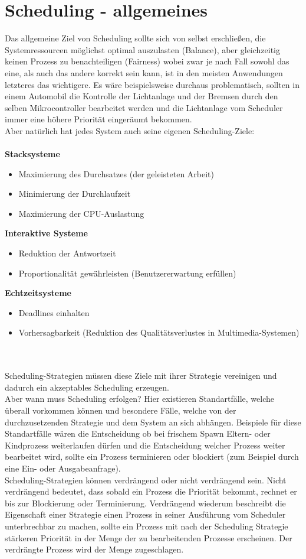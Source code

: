 \section{Scheduling - allgemeines}
Das allgemeine Ziel von Scheduling sollte sich von selbst erschließen, die Systemressourcen möglichst 
optimal auszulasten (Balance), aber gleichzeitig keinen Prozess zu benachteiligen (Fairness) wobei zwar je 
nach Fall sowohl das eine, als auch das andere korrekt sein kann, ist in den meisten Anwendungen letzteres 
das wichtigere. Es wäre beispielsweise durchaus problematisch, sollten in einem Automobil die Kontrolle der 
Lichtanlage und der Bremsen durch den selben Mikrocontroller bearbeitet werden und die Lichtanlage vom 
Scheduler immer eine höhere Priorität eingeräumt bekommen. \\
Aber natürlich hat jedes System auch seine eigenen Scheduling-Ziele: \\ \\
\textbf{Stacksysteme}
\begin{itemize}
	\item Maximierung des Durchsatzes (der geleisteten Arbeit)
	\item Minimierung der Durchlaufzeit
	\item Maximierung der CPU-Auslastung
\end{itemize}
\textbf{Interaktive Systeme}
\begin{itemize}
	\item Reduktion der Antwortzeit
	\item Proportionalität gewährleisten (Benutzererwartung erfüllen)
\end{itemize}
\textbf{Echtzeitsysteme}
\begin{itemize}
	\item Deadlines einhalten
	\item Vorhersagbarkeit (Reduktion des Qualitätsverlustes in Multimedia-Systemen)
\end{itemize}
\cite{tanenb2009} \\ \\
Scheduling-Strategien müssen diese Ziele mit ihrer Strategie vereinigen und dadurch ein akzeptables 
Scheduling erzeugen. \\
Aber wann muss Scheduling erfolgen? Hier existieren Standartfälle, welche überall vorkommen können und 
besondere Fälle, welche von der durchzusetzenden Strategie und dem System an sich abhängen. Beispiele für 
diese Standartfälle wären die Entscheidung ob bei frischem Spawn Eltern- oder Kindprozess weiterlaufen 
dürfen und die Entscheidung welcher Prozess weiter bearbeitet wird, sollte ein Prozess terminieren oder 
blockiert (zum Beispiel durch eine Ein- oder Ausgabeanfrage). \\
Scheduling-Strategien können verdrängend oder nicht verdrängend sein. Nicht verdrängend bedeutet, dass 
sobald ein Prozess die Priorität bekommt, rechnet er bis zur Blockierung oder Terminierung. Verdrängend 
wiederum beschreibt die Eigenschaft einer Strategie einen Prozess in seiner Ausführung vom Scheduler 
unterbrechbar zu machen, sollte ein Prozess mit nach der Scheduling Strategie stärkeren Priorität in der 
Menge der zu bearbeitenden Prozesse erscheinen. Der verdrängte Prozess wird der Menge zugeschlagen.
\\
